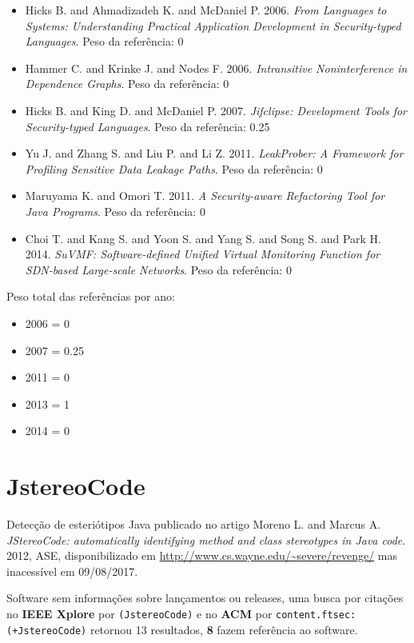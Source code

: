 \begin{itemize}
\item Hicks B. and Ahmadizadeh K. and McDaniel P.
      2006.
      {\it From Languages to Systems: Understanding Practical Application Development in Security-typed Languages}.
      Peso da referência: 0
\item Hammer C. and Krinke J. and Nodes F.
      2006.
      {\it Intransitive Noninterference in Dependence Graphs}.
      Peso da referência: 0
\item Hicks B. and King D. and McDaniel P.
      2007.
      {\it Jifclipse: Development Tools for Security-typed Languages}.
      Peso da referência: 0.25
\item Yu J. and Zhang S. and Liu P. and Li Z.
      2011.
      {\it LeakProber: A Framework for Profiling Sensitive Data Leakage Paths}.
      Peso da referência: 0
\item Maruyama K. and Omori T.
      2011.
      {\it A Security-aware Refactoring Tool for Java Programs}.
      Peso da referência: 0
\item Choi T. and Kang S. and Yoon S. and Yang S. and Song S. and Park H.
      2014.
      {\it SuVMF: Software-defined Unified Virtual Monitoring Function for SDN-based Large-scale Networks}.
      Peso da referência: 0
\end{itemize}

Peso total das referências por ano:

\begin{itemize}
\item 2006 = 0
\item 2007 = 0.25
\item 2011 = 0
\item 2013 = 1
\item 2014 = 0
\end{itemize}


\section{JstereoCode}

Detecção de esteriótipos Java
publicado no artigo
Moreno L. and Marcus A.
{\it JStereoCode: automatically identifying method and class stereotypes in Java code}.
2012,
ASE,
disponibilizado em \url{http://www.cs.wayne.edu/~severe/revenge/}
mas inacessível em 09/08/2017.

Software sem informações sobre lançamentos ou releases,
uma busca por citações no {\bf IEEE Xplore} por
\texttt{(JstereoCode)}
e no {\bf ACM} por
\texttt{content.ftsec:(+JstereoCode)}
retornou
13 resultados,
{\bf 8} fazem referência ao software.

